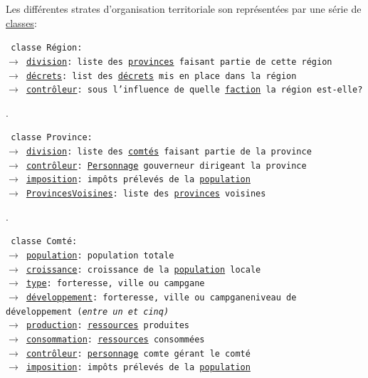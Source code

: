 \documentclass{article}
\newcommand{\ulcolor}[2][class]{\setulcolor{#1}\ul{#2}}
\newcommand{\ulcolor}[2][var]{\setulcolor{#1}\ul{#2}}
\newcommand{\ulcolor}[2][func]{\setulcolor{#1}\ul{#2}}
\newcommand*{\mybox}[2]{\colorbox{#1!30}{\parbox{.98\linewidth}{#2}}}
\newcommand\tab[1][0.5cm]{\hspace*{#1}}
\newcommand{\genbox}[1]{\mybox{verylightgray}{#1}}
\newcommand{\classbox}[1]{\mybox{palegreen}{\texttt{\textcolor{codeColour}{#1}}}}
\newcommand{\classt}[1]{\ulcolor[class]{#1}}
\newcommand{\class}[1]{\texttt{\textcolor{codeColour}{\ulcolor[class]{#1}}}}
\newcommand{\var}[1]{\texttt{\textcolor{codeColour}{\ulcolor[var]{#1}}}}
\begin{document}
                \tab \genbox{
                    Les différentes strates d'organisation territoriale son représentées par une série de \classt{classes}: \\
                    \tab \classbox{
                            classe Région: \\
                            $\rightarrow$ \var{division}: liste des \class{provinces} faisant partie de cette région\\
                            $\rightarrow$ \var{d\'ecrets}: list des \class{d\'ecrets} mis en place dans la région \\
                            $\rightarrow$ \var{contr\^oleur}: sous l'influence de quelle \class{faction} la région est-elle?\\  
                    } 
                    \color{verylightgray} .\\
                    \tab \classbox{
                            classe Province: \\
                            $\rightarrow$ \var{division}: liste des \class{comt\'es} faisant partie de la province\\
                            $\rightarrow$ \var{contr\^oleur}: \class{Personnage} gouverneur dirigeant la province\\
                            $\rightarrow$ \var{imposition}: impôts prélevés de la \var{population}\\
                            $\rightarrow$ \var{ProvincesVoisines}: liste des \class{provinces} voisines \\  
                    }
                    \color{verylightgray} .\\
                    \tab \classbox{
                            classe Comté: \\
                            $\rightarrow$ \var{population}: population totale\\
                            $\rightarrow$ \var{croissance}: croissance de la \var{population} locale\\
                            $\rightarrow$ \var{type}: forteresse, ville ou campgane\\
                            $\rightarrow$ \var{d\'eveloppement}: forteresse, ville ou campganeniveau de développement (\textit{entre un et cinq)}\\
                            $\rightarrow$ \var{production}: \class{ressources} produites\\
                            $\rightarrow$ \var{consommation}: \class{ressources} consommées\\
                            $\rightarrow$ \var{contr\^oleur}: \class{personnage} comte gérant le comté\\
                            $\rightarrow$ \var{imposition}: impôts prélevés de la \var{population}\\
                    }
                }
\end{document}
